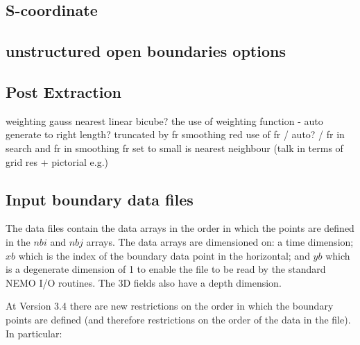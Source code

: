 \subsection{S-coordinate}
\label{s_coord}


\subsection{unstructured open boundaries options}
\label{bdyopts}




\subsection{Post Extraction}
\label{pe}

weighting gauss nearest linear bicube?
the use of weighting function - auto generate to right length? truncated by fr smoothing red
use of fr / auto? / 
fr in search and fr in smoothing
fr set to small is nearest neighbour (talk in terms of grid res + pictorial e.g.)






\subsection{Input boundary data files}
\label{BDY_data}

The data files contain the data arrays
in the order in which the points are defined in the $nbi$ and
$nbj$
arrays. The data arrays are dimensioned on: a time dimension;
$xb$ which is the index of the boundary data point in the
horizontal;
and $yb$ which is a degenerate dimension of 1 to enable the file
to be
read by the standard NEMO I/O routines. The 3D fields also have
a
depth dimension. 

At Version 3.4 there are new restrictions on the order in which
the
boundary points are defined (and therefore restrictions on the
order
of the data in the file). In particular:

